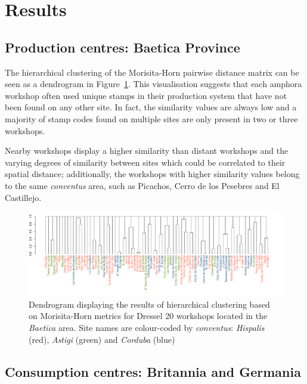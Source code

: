 \documentclass[review]{elsarticle}
\begin{document}
\section{Results}

\subsection{Production centres: Baetica Province}


The hierarchical clustering of the Morisita-Horn pairwise distance matrix can be seen as a dendrogram in Figure~\ref{dendro}. This visualisation suggests that each amphora workshop often used unique stamps in their production system that have not been found on any other site. In fact, the similarity values are always low and a majority of stamp codes found on multiple sites are only present in two or three workshops.

Nearby workshops display a higher similarity than distant workshops and the varying degrees of similarity between sites which could be correlated to their spatial distance; additionally, the workshops with higher similarity values belong to the same \textit{conventus} area, such as Picachos, Cerro de los Pesebres and El Castillejo.

\begin{figure}
	\centering
\includegraphics[angle=180, width=\linewidth]{figs/dendro}
\caption{Dendrogram displaying the results of hierarchical clustering based on Morisita-Horn metrics for Dressel 20 workshops located in the \textit{Baetica} area. Site names are colour-coded by \textit{conventus}: \textit{Hispalis} (red), \textit{Astigi} (green) and \textit{Corduba} (blue)}
\label{dendro}
\end{figure} 


\subsection{Consumption centres: Britannia and Germania}
\end{document}
